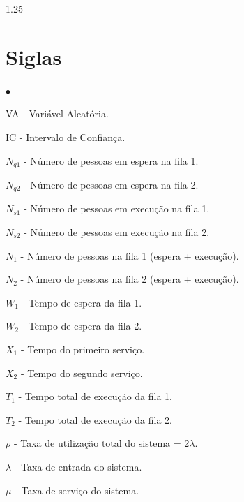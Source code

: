 \documentclass[a4paper,12pt]{report}
\begin{document}




\begin{spacing}{1.25}
\chapter*{Siglas}
\begin{list}{$\bullet$}{}
  \item[VA] - Variável Aleatória.
  \item[IC] - Intervalo de Confiança.
  \item[$N_{q1}$] - Número de pessoas em espera na fila 1.
  \item[$N_{q2}$] - Número de pessoas em espera na fila 2.
  \item[$N_{s1}$] - Número de pessoas em execução na fila 1.
  \item[$N_{s2}$] - Número de pessoas em execução na fila 2.
  \item[$N_1$] - Número de pessoas na fila 1 (espera + execução).
  \item[$N_2$] - Número de pessoas na fila 2 (espera + execução).
  \item[$W_1$] - Tempo de espera da fila 1.
  \item[$W_2$] - Tempo de espera da fila 2.
  \item[$X_1$] - Tempo do primeiro serviço.
  \item[$X_2$] - Tempo do segundo serviço.
  \item[$T_1$] - Tempo total de execução da fila 1.
  \item[$T_2$] - Tempo total de execução da fila 2.
  \item[$\rho$] - Taxa de utilização total do sistema = 2$\lambda$.
  \item[$\lambda$] - Taxa de entrada do sistema.
  \item[$\mu$] - Taxa de serviço do sistema.
  
\end{list}
\end{spacing}

\tableofcontents

\end{document}
